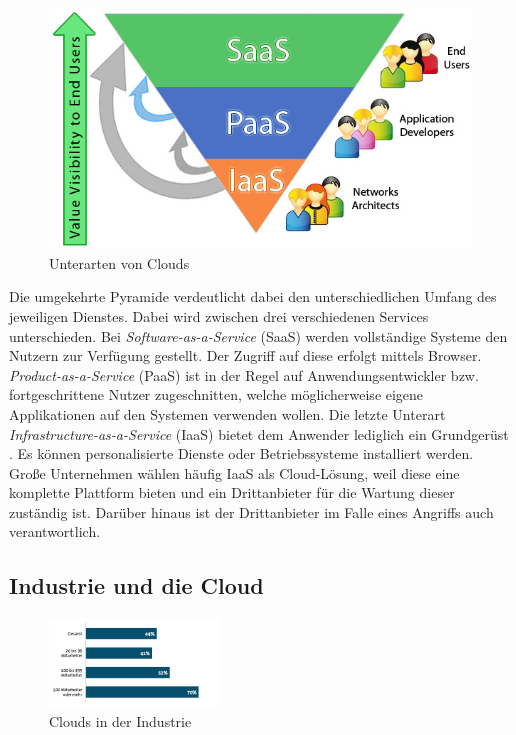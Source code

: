 \documentclass[conference]{IEEEtran}
\begin{document}
\begin{figure}[h]
\centering
  \includegraphics[width=0.7\columnwidth]{clouds}
  \caption{Unterarten von Clouds}
  \label{fig:soc}
\end{figure}

Die umgekehrte Pyramide verdeutlicht dabei den unterschiedlichen Umfang des jeweiligen Dienstes.
Dabei wird zwischen drei verschiedenen Services unterschieden. Bei \textit{Software-as-a-Service} (SaaS) werden vollständige Systeme den Nutzern zur Verfügung gestellt. Der Zugriff auf diese erfolgt mittels Browser.\\
\textit{Product-as-a-Service} (PaaS) ist in der Regel auf Anwendungsentwickler bzw. fortgeschrittene Nutzer zugeschnitten, welche möglicherweise eigene Applikationen auf den Systemen verwenden wollen. Die letzte Unterart \textit{Infrastructure-as-a-Service} (IaaS) bietet dem Anwender lediglich ein Grundgerüst \cite{channel2015}. Es können personalisierte Dienste oder Betriebssysteme installiert werden. Große Unternehmen wählen häufig IaaS als Cloud-Lösung, weil diese eine komplette Plattform bieten und ein Drittanbieter für die Wartung dieser zuständig ist. Darüber hinaus ist der Drittanbieter im Falle eines Angriffs auch verantwortlich.

\subsection{Industrie und die Cloud}
\begin{figure}[h]
\centering
  \includegraphics[width=0.4\textwidth]{firmen}
  \caption{Clouds in der Industrie}
  \label{fig:clouds}
\end{figure}
\end{document}
